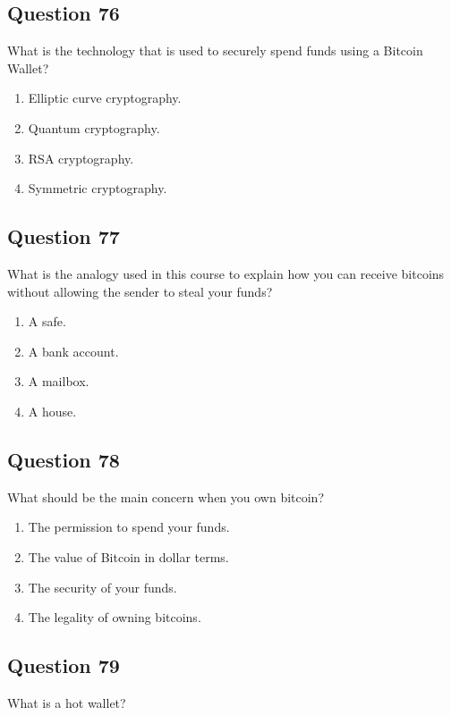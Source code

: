 \documentclass[12pt,a4paper]{article}
\begin{document}
\bigskip


\subsection*{Question 76}
What is the technology that is used to securely spend funds using a Bitcoin Wallet?

\begin{enumerate}[label=\Alph*., leftmargin=*]
\item Elliptic curve cryptography.
\item Quantum cryptography.
\item RSA cryptography.
\item Symmetric cryptography.
\end{enumerate}

\bigskip


\subsection*{Question 77}
What is the analogy used in this course to explain how you can receive bitcoins without allowing the sender to steal your funds?

\begin{enumerate}[label=\Alph*., leftmargin=*]
\item A safe.
\item A bank account.
\item A mailbox.
\item A house.
\end{enumerate}

\bigskip


\subsection*{Question 78}
What should be the main concern when you own bitcoin?

\begin{enumerate}[label=\Alph*., leftmargin=*]
\item The permission to spend your funds.
\item The value of Bitcoin in dollar terms.
\item The security of your funds.
\item The legality of owning bitcoins.
\end{enumerate}

\bigskip


\subsection*{Question 79}
What is a hot wallet?
\end{document}
